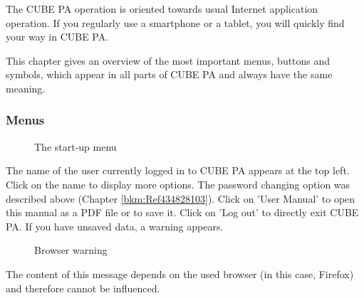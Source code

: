 The CUBE PA operation is oriented towards usual Internet application operation. If you regularly use a smartphone or a tablet, you will quickly find your way in CUBE PA.

\vspace{\baselineskip}

This chapter gives an overview of the most important menus, buttons and symbols, which appear in all parts of CUBE PA and always have the same meaning.

\pagebreak

\subsubsection{Menus}

\begin{figure}[H]
\caption{The start-up menu}
\end{figure}


The name of the user currently logged in to CUBE PA appears at the top left. Click on the name to display more options. The password changing option was described above (Chapter \ref{bkm:Ref434828103}). Click on 'User Manual' to open this manual as a PDF file or to save it. Click on 'Log out' to directly exit CUBE PA. If you have unsaved data, a warning appears.

\begin{figure}[H]
\caption{Browser warning}
\end{figure}
\begin{small}
The content of this message depends on the used browser (in this case, Firefox) and therefore cannot be influenced.
\end{small}

